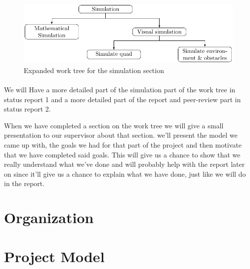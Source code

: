 \documentclass{article}
\begin{document}
		\begin{figure}[H]
			\centering
			\includegraphics[width=.8\linewidth]{Workplan_work_tree/simulation_work_tree_diagram}
			\caption{Expanded work tree for the simulation section}
		\end{figure}
		
		\paragraph{} We will Have a more detailed part of the simulation part of the work tree in status report 1 and a more detailed part of the report and peer-review part in status report 2.
		
		\vspace{1em}
		When we have completed a section on the work tree we will give a small presentation to our supervisor about that section. we'll present the model we came up with, the goals we had for that part of the project and then motivate that we have completed said goals. This will give us a chance to show that we really understand what we've done and will probably help with the report later on since it'll give us a chance to explain what we have done, just like we will do in the report.  
			
	\section{Organization}
	
	\section{Project Model}
	
	
\end{document}
